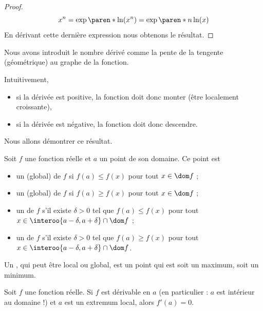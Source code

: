 \begin{frame}
\begin{proof}\pause %
    \begin{equation*}
      x^n = \exp{\paren*{\ln(x^n)}} = \exp{\paren*{n \ln(x)}}
    \end{equation*}
    En dérivant cette dernière expression nous obtenons le résultat.
  \end{proof}
\end{frame}

\begin{frame}%
  Nous avons introduit le nombre dérivé comme la pente de la tengente (géométrique) au graphe de la fonction.\pause
  
  Intuitivement,
  \begin{itemize}\pause
  \item si la dérivée est positive, la fonction doit donc \og monter\fg{} (être localement croissante),\pause
  \item si la dérivée est négative, la fonction doit donc \og descendre\fg{}.
  \end{itemize}\pause

  Nous allons  démontrer ce résultat.
\end{frame}

\begin{frame}%
  \begin{definition}%
    Soit \(f\) une fonction réelle et \(a\) un point de son domaine. Ce point est
    \begin{itemize}[<+->]
    \item un  (global) de \(f\) si \(f(a) \leq f(x)\) pour tout \(x \in \dom f\) ;
    \item un  (global) de \(f\) si \(f(a) \geq f(x)\) pour tout \(x \in \dom f\) ;
    \item un  de \(f\) s'il existe \(\delta > 0\) tel que \(f(a) \leq f(x)\) pour tout \(x \in \interoo{a-\delta,a+\delta}\cap \dom f\) ;
    \item un  de \(f\) s'il existe \(\delta > 0\) tel que \(f(a) \geq f(x)\) pour tout \(x \in \interoo{a-\delta,a+\delta}\cap \dom f\).
    \end{itemize}\pause{}
    Un , qui peut être local ou global, est un point qui est soit un maximum, soit un minimum.
  \end{definition}
  \begin{theorem}\pause{}
    Soit \(f\) une fonction réelle.\pause{} Si \(f\) est dérivable en \(a\) (en particulier : \(a\) est intérieur au domaine !)\pause{} et \(a\) est un extremum local,\pause{} alors \(f'(a) = 0\).
  \end{theorem}
\end{frame}
